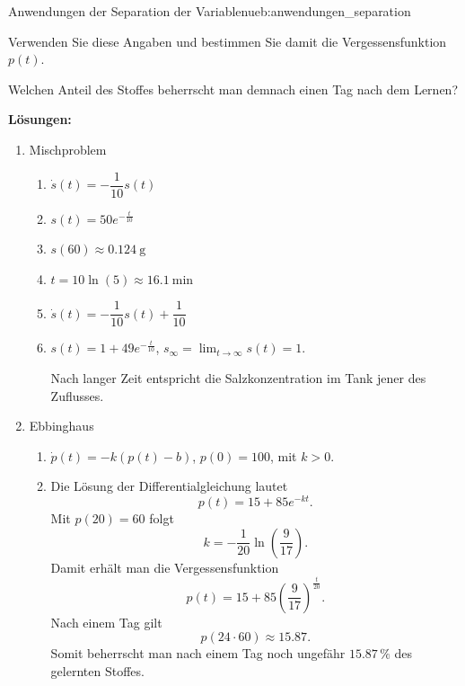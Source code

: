 \begin{ueb}{Anwendungen der Separation der Variablen}{ueb:anwendungen_separation}
\begin{enumerate}
\begin{enumerate}[label=\alph*)]
                        Verwenden Sie diese Angaben und bestimmen
                        Sie damit die Vergessensfunktion \(p(t)\).

                        Welchen Anteil des Stoffes beherrscht man
                        demnach einen Tag nach dem Lernen?
              \end{enumerate}
    \end{enumerate}

\end{ueb}
\pagebreak

\textbf{Lösungen:}

\begin{enumerate}
    \item Mischproblem
          \begin{enumerate}[label=\alph*)]
              \item \(\dot{s}(t)=-\dfrac{1}{10}s(t)\)

              \item \(s(t)=50e^{-\frac{t}{10}}\)

              \item \(s(60)\approx \qty{0.124}{\gram}\)

              \item \(t=10\ln(5)\approx \qty{16.1}{\minute}\)

              \item \(\dot{s}(t)=-\dfrac{1}{10}s(t)+\dfrac{1}{10}\)

              \item \(s(t)=1+49e^{-\frac{t}{10}}\),
                    \(\displaystyle s_\infty=\lim_{t\to\infty}s(t)=1\).

                    Nach langer Zeit entspricht die Salzkonzentration
                    im Tank jener des Zuflusses.
          \end{enumerate}

    \item Ebbinghaus
          \begin{enumerate}[label=\alph*)]
              \item \(\dot{p}(t)=-k(p(t)-b)\),
                    \(p(0)=100\), mit \(k>0\).

              \item Die Lösung der Differentialgleichung lautet
                    \[
                        p(t)=15+85e^{-kt}.
                    \]
                    Mit \(p(20)=60\) folgt
                    \[
                        k=-\frac{1}{20}\ln\left(\frac{9}{17}\right).
                    \]
                    Damit erhält man die Vergessensfunktion
                    \[
                        p(t)=15+85\left(\frac{9}{17}\right)^{\frac{t}{20}}.
                    \]
                    Nach einem Tag gilt
                    \[
                        p(24\cdot 60)\approx 15.87.
                    \]
                    Somit beherrscht man nach einem Tag noch
                    ungefähr \(15.87\,\%\) des gelernten Stoffes.
          \end{enumerate}
\end{enumerate}
